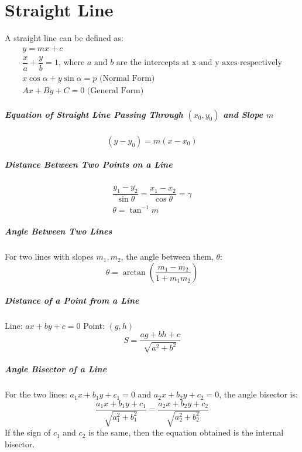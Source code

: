 \chapter{Straight Line}
A straight line can be defined as:
\begin{align}
	y=mx+c\\
	\dfrac{x}{a}+\dfrac{y}{b}=1\text{, where }a\text{ and }b\text{ are the intercepts at x and y axes respectively}\\
	x\cos\alpha + y\sin\alpha = p\text{ (Normal Form)}\\
	Ax+By+C=0\text{ (General Form)}
\end{align}

\paragraph{Equation of Straight Line Passing Through $(x_0,y_0)$ and Slope $m$}
\begin{equation}
	(y-y_0)=m(x-x_0)
\end{equation}

\paragraph{Distance Between Two Points on a Line}
\begin{align}
	\dfrac{y_1-y_2}{\sin\theta}=\dfrac{x_1-x_2}{\cos\theta}=\gamma\\
	\theta=\tan^{-1}m
\end{align}

\paragraph{Angle Between Two Lines}
For two lines with slopes $m_1, m_2$, the angle between them, $\theta$:
\begin{equation}
	\theta=\arctan\left(\dfrac{m_1-m_2}{1+m_1m_2}\right)
\end{equation}

\paragraph{Distance of a Point from a Line}
Line: $ax+by+c=0$
Point: $(g,h)$
\begin{equation}
	S=\dfrac{ag+bh+c}{\sqrt{a^2+b^2}}
\end{equation}

\paragraph{Angle Bisector of a Line}
For the two lines: $a_1x+b_1y+c_1=0$ and $a_2x+b_2y+c_2=0$, the angle bisector is:
\begin{equation}
	\dfrac{a_1x+b_1y+c_1}{\sqrt{a_1^2+b_1^2}}=\dfrac{a_2x+b_2y+c_2}{\sqrt{a_2^2+b_2^2}}
\end{equation}
If the sign of $c_1$ and $c_2$ is the same, then the equation obtained is the internal bisector.


